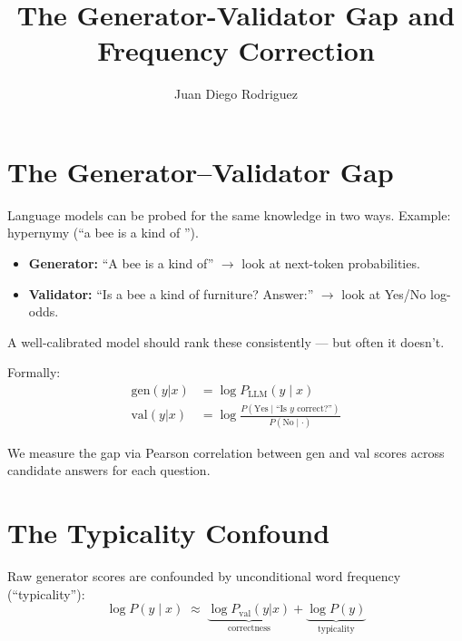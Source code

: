\documentclass[11pt]{article}
\title{The Generator-Validator Gap and Frequency Correction}
\author{Juan Diego Rodriguez}
\date{}
\begin{document}
\maketitle

\section{The Generator--Validator Gap}

Language models can be probed for the same knowledge in two ways.
Example: hypernymy (``a bee is a kind of \underline{\quad}'').

\begin{itemize}
  \item \textbf{Generator:} ``A bee is a kind of'' $\to$ look at next-token probabilities.
  \item \textbf{Validator:} ``Is a bee a kind of furniture? Answer:'' $\to$ look at Yes/No log-odds.
\end{itemize}

A well-calibrated model should rank these consistently --- but often it doesn't.

Formally:
\begin{align}
  \text{gen}(y|x) &= \log P_{\text{LLM}}(y \mid x) \\
  \text{val}(y|x) &= \log \frac{P(\text{Yes} \mid \text{``Is } y \text{ correct?''})}{P(\text{No} \mid \cdot)}
\end{align}

We measure the gap via Pearson correlation between gen and val scores across candidate answers for each question.



\section{The Typicality Confound}

Raw generator scores are confounded by unconditional word frequency (``typicality''):
\[
  \log P(y \mid x) \;\approx\; \underbrace{\log P_{\text{val}}(y|x)}_{\text{correctness}} + \underbrace{\log P(y)}_{\text{typicality}}
\]
\end{document}
